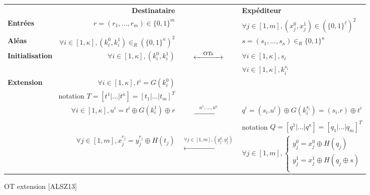 \documentclass{article}
\begin{document}
\begin{figure}[h]
\centering
\begin{tabular}{|lrcl|}
\hline
 & \textbf{Destinataire} & & \textbf{Expéditeur}\\
\textbf{Entrées} & $r = (r_1,...,r_m) \in \{0,1\}^m$ & & $\forall j \in [1,m], (x_j^0, x_j^1) \in \left( \{0,1\}^{\ell} \right) ^2$ \\
\textbf{Aléas} & $\forall i \in [1,\kappa], (k_i^0, k_i^1) \in _R \left( \{0,1\}^{\kappa} \right) ^2$ & & $s=(s_1,...,s_{\kappa}) \in_R \{0,1\}^{\kappa}$\\
\textbf{Initialisation} & $\forall i \in [1,\kappa], (k_i^0, k_i^1)$ & $\xleftrightarrow{\hspace{1em} \text{OTs} \hspace{1em}}$ & $\forall i \in [1,\kappa], s_i$ \\
 & & & $\forall i \in [1,\kappa], k_i^{s_i}$ \\
\textbf{Extension} & $\forall i \in [1,\kappa], t^i = G(k_i^0)$& & \\
\multicolumn{2}{|r}{notation $T = [t^1|...|t^{\kappa}]=[t_1|...|t_m]^T$} & & \\
 & $\forall i \in [1,\kappa], u^i = t^i \oplus G(k_i^1) \oplus r$ & $\xrightarrow{\hspace{1em} u^1, ..., u^{\kappa} \hspace{1em}}$ & $q^i = (s_i. u^i)\oplus G(k_i^{s_i}) = (s_i.r) \oplus t^i$ \\
\multicolumn{4}{|r|}{notation $Q = [q^1|...|q^{\kappa}] = [q_1|...|q_m]^T$} \\
 & $\forall j \in [1,m], x_j^{r_j} = y_j^{r_j} \oplus H(t_j)$ & $\xleftarrow{\forall j \in [1,m], (y_j^0, y_j^1)}$ & $\forall j \in [1,m], \begin{cases} y_j^0 = x_j^0 \oplus H(q_j) \\ y_j^1 = x_j^1 \oplus H(q_j \oplus s) \\ \end{cases}$ \\
\hline
\end{tabular}
\captionsetup{labelformat=empty}
\caption{OT extension [ALSZ13]}
\end{figure}
\end{document}
